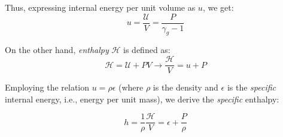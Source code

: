 Thus, expressing internal energy per unit volume as \(u\), we get:
%
\begin{equation}
u = \frac{\mathcal U}{V} = \frac{P}{\gamma_g - 1}
\end{equation}

On the other hand, \emph{enthalpy} \( \mathcal H\) is defined as:
\[
\mathcal H = \mathcal U + PV \rightarrow  \frac{\mathcal H}{V} = u + P
\]

Employing the relation \(u = \rho \epsilon\) (where \(\rho\) is the density and \(\epsilon\) is the \emph{specific} internal energy, i.e., energy per unit mass), we derive the \emph{specific} enthalpy:
\begin{remark}
\begin{equation}
h = \frac{1}{\rho} \frac{\mathcal H}{V} = \epsilon + \frac{P}{\rho}
\end{equation}
\end{remark}



